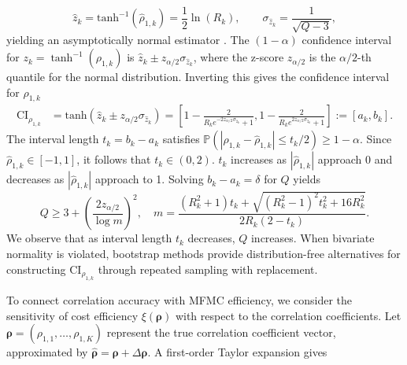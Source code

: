 %
\begin{equation*}
\label{eq:Fisher_z_n_SD}
    \widehat z_k  = \text{tanh}^{-1}\left(\widehat \rho_{1,k}\right) = \frac 1 2\ln \left(R_k\right),\qquad \sigma_{\widehat z_k} = \frac{1}{\sqrt{Q - 3}},
\end{equation*}
%
yielding an asymptotically normal estimator \cite{BiHi:2017,Fi:1915,Fi:1921}. The $(1-\alpha)$ confidence interval for $z_k = \tanh^{-1}(\rho_{1,k})$ is $\widehat z_k \pm z_{\alpha/2}\sigma_{\widehat z_k}$, where the z-score $z_{\alpha/2}$ is the $\alpha/2$-th quantile for the normal distribution. Inverting this gives the confidence interval for $\rho_{1,k}$
%
\begin{align}
    \label{eq:Confidence_Interval_rho}
    \text{CI}_{\rho_{1,k}} &= \text{tanh}\left(\widehat z_k \pm  z_{\alpha/2}\sigma_{\widehat z_k}\right)
    =\left[1-\frac{2}{R_k e^{-2z_{\alpha/2}\sigma_{\widehat z_k}}+1}, 1-\frac{2}{R_k e^{2z_{\alpha/2}\sigma_{\widehat z_k}}+1}\right] := [a_k,b_k].
\end{align}
%
The interval length $t_k=b_k - a_k$ satisfies $ \mathbb{P}(|\rho_{1,k}-\widehat \rho_{1,k}|\le t_k/2)\ge 1-\alpha$. Since $\widehat \rho_{1,k} \in [-1,1]$, it follows that $t_k \in (0, 2)$. $t_k$ increases as $|\widehat \rho_{1,k}|$ approach 0 and decreases as $|\widehat \rho_{1,k}|$ approach to 1. Solving $b_k - a_k = \delta$ for $Q$ yields
%
\begin{equation}\label{eq:Pilot_sample_size_estimate}
    Q \ge 3 + \left( \frac{2 z_{\alpha/2}}{\log m} \right)^2, \quad m = \frac{(R_k^2 + 1) t_k + \sqrt{(R_k^2 - 1)^2 t_k^2 + 16 R_k^2}}{2 R_k (2 - t_k)}.
\end{equation}
%
We observe that as interval length $t_k$ decreases, $Q$ increases. When bivariate normality is violated, bootstrap methods \cite{BeDeToMeBaRo:2007,Ef:1979,EfTi:1993} provide distribution-free alternatives for constructing $\text{CI}_{\rho_{1,k}}$ through repeated sampling with replacement. 


To connect correlation accuracy with MFMC efficiency, we consider the sensitivity of cost efficiency $\xi(\boldsymbol{\rho})$ with respect to the correlation coefficients. Let  $\boldsymbol{\rho} = (\rho_{1,1},\ldots, \rho_{1,K})$ represent the true correlation coefficient vector, approximated by $\widehat {\boldsymbol{\rho}}  = \boldsymbol{\rho}+\Delta \boldsymbol{\rho}$. A first-order Taylor expansion gives

